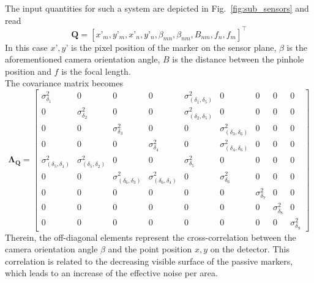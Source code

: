 \documentclass[5p,times,procedia]{elsarticle}
\begin{document}
The input quantities for such a system are depicted in Fig.~\ref{fig:sub_sensors} and read
\begin{equation*}
	\mathbf{Q}= \left[x’_m, y’_m, x’_n, y’_n, \beta_{mn}, \beta_{nm}, B_{nm}, f_{n},f_{m}\right]^{\top}
\end{equation*}
In this case $x’, y’$ is the pixel position of the marker on the sensor plane, $\beta$ is the aforementioned camera orientation angle, $B$ is the distance between the pinhole position and $f$ is the focal length. \\
 
The covariance matrix becomes
\begin{equation}
	\label{eqn:CovarianceMatrix}
	\mathbf{\Lambda_{Q}} = 
	\begin{bmatrix}
		\sigma_{\delta_1}^2  & 0 & 0 & 0 & \sigma_{(\delta_1,\delta_5)}^2 & 0 & 0 & 0 & 0 \\
		0  & \sigma_{\delta_2}^2 & 0 & 0 & \sigma_{(\delta_2,\delta_5)}^2 & 0 & 0 & 0 & 0 \\
		0 & 0 & \sigma_{\delta_3}^2 & 0 & 0 & \sigma_{(\delta_3,\delta_6)}^2 & 0 & 0 & 0 \\
		0 & 0 & 0 & \sigma_{\delta_4}^2 & 0 & \sigma_{(\delta_4,\delta_6)}^2 & 0 & 0 & 0 \\
		\sigma_{(\delta_5,\delta_1)}^2 & \sigma_{(\delta_5,\delta_2)}^2 & 0 & 0 & \sigma_{\delta_5}^2 & 0 & 0 & 0 & 0 \\
		0 & 0 & \sigma_{(\delta_6,\delta_3)}^2 & \sigma_{(\delta_6,\delta_4)}^2 & 0 & \sigma_{\delta_6}^2 & 0 & 0 & 0 \\
		0 & 0 & 0 & 0 & 0 & 0 & \sigma_{\delta_7}^2 & 0 & 0 \\
		0 & 0 & 0 & 0 & 0 & 0 & 0 & \sigma_{\delta_8}^2 & 0 \\
		0 & 0 & 0 & 0 & 0 & 0 & 0 & 0 & \sigma_{\delta_9}^2
	\end{bmatrix}
\end{equation}
Therein, the off-diagonal elements represent the cross-correlation between the camera orientation angle $\beta$ and the point position $x,y$ on the detector.
This correlation is related to the decreasing visible surface of the passive markers, which leads to an increase of the effective noise per area.\\
\end{document}
